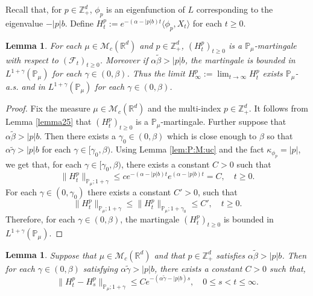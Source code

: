 \documentclass[12pt,a4paper]{amsart}
\theoremstyle{plain}
\newtheorem{lem}[thm]{Lemma}
\theoremstyle{definition}
\numberwithin{equation}{section}
\begin{document}
Recall that, for $p\in \mathbb Z_+^d$,  $\phi_p$ is an eigenfunction of $L$ corresponding to the eigenvalue $-|p|b$. 
Define $ H_t^p :=e^{-(\alpha-|p|b)t}\langle\phi_p,X_t\rangle$ for each $t\geq 0$.

\begin{lem}
  \label{lem:M:L:ML}
   For each $\mu\in \mathcal M_c(\mathbb R^d)$ and $p \in \mathbb Z_+^d$, $(H^p_t)_{t\geq 0}$ is a $\mathbb P_{\mu}$-martingale with respect to $(\mathscr F_t)_{t\geq 0}$.
    Moreover if $\alpha\tilde \beta>|p|b$, the martingale is bounded in $L^{1+\gamma}(\mathbb P_\mu)$ for each $\gamma\in (0, \beta)$.
  Thus the limit $ H_{\infty}^p := \lim_{t\rightarrow \infty}H_t^p $  exists $\mathbb{P}_{\mu}$-a.s. and in $L^{1+\gamma}(\mathbb{P}_{\mu})$ for each $\gamma \in (0,\beta)$.
\end{lem}

\begin{proof}
  Fix the measure $\mu \in \mathcal M_c(\mathbb R^d)$ and the multi-index $p \in \mathbb Z_+^d$.
  It follows from Lemma \ref{lemma25} that $(H_t^p)_{t\geq 0}$ is a $\mathbb P_\mu$-martingale.
  Further suppose that $\alpha \tilde \beta > |p| b$.
  Then there exists a $\gamma_0 \in (0,\beta)$ which is close enough to $\beta$ so that $\alpha\tilde \gamma>|p|b$ for each $\gamma\in [\gamma_0, \beta)$.
  Using  Lemma \ref{lem:P:M:uc} and the fact $\kappa_{\phi_p}=|p|$, we get that, for each $\gamma\in [\gamma_0, \beta)$, there exists a constant $C>0$ such that
  \[
    \|H_t^p\|_{\mathbb P_\mu;1+\gamma}
    \leq c e^{-(\alpha-|p|b)t}e^{(\alpha-|p|b)t}
    = C
    , \quad t\geq 0.
  \]
  For each $\gamma\in (0, \gamma_0)$ there exists a constant $C'>0$, such that
  \[
    \| H_t^p \|_{\mathbb P_\mu;1+\gamma}
    \leq \| H_t^p \|_{\mathbb P_\mu;1+\gamma_0}
    \leq C',
    \quad t\geq 0.
  \]
  Therefore, for each $\gamma \in (0,\beta)$, the martingale $(H_t^p)_{t\geq 0}$ is bounded in $L^{1+\gamma}(\mathbb{P}_{\mu})$.
\end{proof}

\begin{lem}
  \label{lem: control of wt}
  Suppose that $\mu\in \mathcal M_c(\mathbb R^d)$ and that $p \in \mathbb Z_+^d$ satisfies $\alpha \tilde \beta > |p|b$.
  Then for each $\gamma \in (0,\beta)$ satisfying $\alpha \tilde \gamma > |p|b$, there exists a constant $C> 0$ such that,
  \[
    \|H^p_t-H^p_s\|_{\mathbb{P}_{\mu};1+\gamma}
    \leq C e^{-(\alpha \tilde \gamma-|p|b)s},
    \quad 0 \leq s < t \leq \infty.
  \]
\end{lem}
\end{document}
